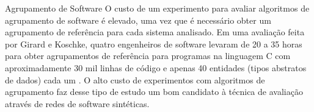 \begin{section}{Agrupamento de Software}
O custo de um experimento para avaliar algoritmos de agrupamento de software é elevado, uma vez que é necessário obter um agrupamento de referência para cada sistema analisado. Em uma avaliação feita por Girard e Koschke, quatro engenheiros de software levaram de 20 a 35 horas para obter agrupamentos de referência para programas na linguagem C com aproximadamente 30 mil linhas de código e apenas 40 entidades (tipos abstratos de dados) cada um \cite{Girard2000}. O alto custo de experimentos com algoritmos de agrupamento faz desse tipo de estudo um bom candidato à técnica de avaliação através de redes de software sintéticas.


\end{section}

